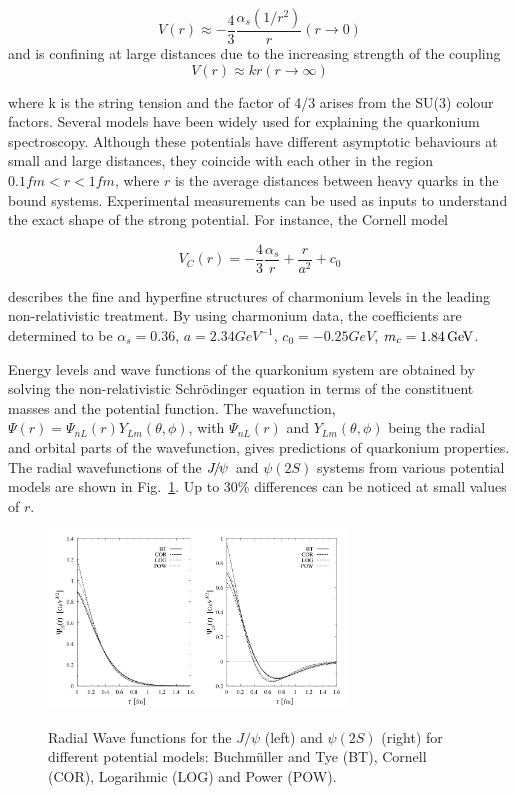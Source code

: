 \begin{equation}
V(r) \approx -{\frac{4}{3}}{\frac{\alpha_s(1/r^2)}{r}}   (r\rightarrow 0)
\end{equation}
\noindent and is confining at large distances due to the increasing strength 
of the coupling
\begin{equation}
V(r) \approx kr (r\rightarrow \infty)
\end{equation}

\noindent where k is the string tension and the factor of 4/3 arises from the
SU(3) colour factors. Several models have been widely used for explaining the
quarkonium spectroscopy. Although these potentials have different asymptotic
behaviours at small and large distances, they coincide with each other in the
region $0.1 fm < r <1 fm$, where $r$ is the average distances between heavy quarks
in the bound systems. Experimental measurements can be used as inputs to
understand the exact shape of the strong potential. For instance, the Cornell
model

\begin{equation}
V_C(r) = -{\frac{4}{3}}{\frac{\alpha_s}{r}} + {\frac{r}{a^2}} + c_0
\end{equation}  

describes the fine and hyperfine structures of charmonium levels in the leading
non-relativistic treatment. By using charmonium data, the coefficients are
determined to be $\alpha_s = 0.36$, $a=2.34 GeV^{-1}$, $c_0 = -0.25 GeV$, $m_c
= 1.84\mathrm{\,Ge\kern -0.1em V}$.

Energy levels and wave functions of the quarkonium system are obtained by solving 
the non-relativistic Schr\"odinger equation in terms of the constituent masses and the 
potential function. The wavefunction, $\Psi(r) = \Psi_{nL}(r)Y_{Lm}(\theta,\phi)$, with 
$\Psi_{nL}(r)$ and $Y_{Lm}(\theta,\phi)$ being the radial and orbital parts of the wavefunction, 
gives predictions of quarkonium properties. The radial wavefunctions of the ${{J\mskip -3mu/\mskip -2mu\psi\mskip 2mu}}$ and 
$\psi(2S)$ systems from various potential models are shown in Fig.~\ref{fig:psipot}. 
Up to 30\% differences can be noticed at small values of $r$. 

\begin{figure}
\center
\includegraphics[width=300px]{figs/review/psipot.png}
\label{fig:psipot} 
\caption{Radial Wave functions for the $J/\psi$ (left) and $\psi(2S)$ (right) for different 
potential models: Buchm\"uller and Tye (BT), Cornell (COR), Logarihmic (LOG) and Power (POW). }
\end{figure} 


